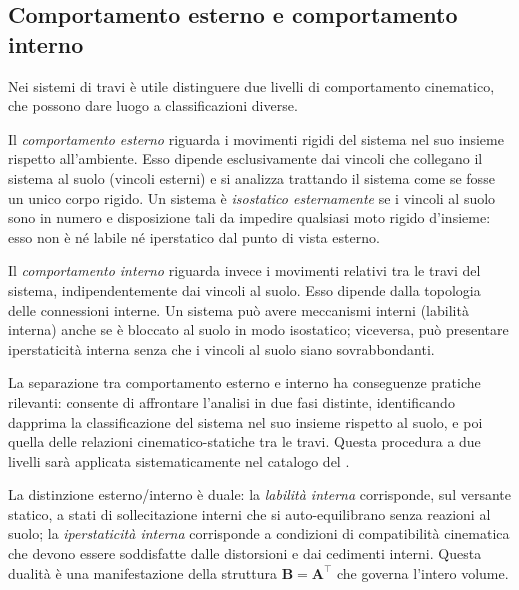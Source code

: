 \subsection{Comportamento esterno e comportamento interno}
\label{subsec:est_int}

Nei sistemi di travi è utile distinguere due livelli di
comportamento cinematico, che possono dare luogo a
classificazioni diverse.

Il \emph{comportamento esterno} riguarda i movimenti
rigidi del sistema nel suo insieme rispetto all'ambiente.
Esso dipende esclusivamente dai vincoli che collegano
il sistema al suolo (vincoli esterni) e si analizza
trattando il sistema come se fosse un unico corpo rigido.
Un sistema è \emph{isostatico esternamente} se i vincoli
al suolo sono in numero e disposizione tali da impedire
qualsiasi moto rigido d'insieme: esso non è né labile
né iperstatico dal punto di vista esterno.

Il \emph{comportamento interno} riguarda invece i movimenti
relativi tra le travi del sistema, indipendentemente dai
vincoli al suolo. Esso dipende dalla topologia delle
connessioni interne. Un sistema può avere meccanismi interni
(labilità interna) anche se è bloccato al suolo in modo
isostatico; viceversa, può presentare iperstaticità interna
senza che i vincoli al suolo siano sovrabbondanti.


La separazione tra comportamento esterno e interno ha
conseguenze pratiche rilevanti: consente di affrontare
l'analisi in due fasi distinte, identificando dapprima
la classificazione del sistema nel suo insieme rispetto
al suolo, e poi quella delle relazioni cinematico-statiche
tra le travi. Questa procedura a due livelli sarà applicata
sistematicamente nel catalogo del .


\begin{oss}
	La distinzione esterno/interno è duale: la
	\emph{labilità interna} corrisponde, sul versante
	statico, a stati di sollecitazione interni che si
	auto-equilibrano senza reazioni al suolo; la
	\emph{iperstaticità interna} corrisponde a condizioni
	di compatibilità cinematica che devono essere soddisfatte
	dalle distorsioni e dai cedimenti interni. Questa
	dualità è una manifestazione della struttura
	$\bm{B} = \bm{A}^{\top}$ che governa l'intero volume.
\end{oss}

